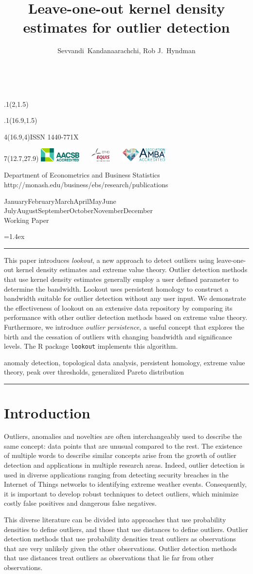 \documentclass[11pt,a4paper,]{article}
\title{Leave-one-out kernel density estimates for outlier detection}
\author{Sevvandi~Kandanaarachchi, Rob J.~Hyndman}
\date{\sf\Date~\Month~\Year}
\makeatletter
\def\Date{\number\day}
\def\Month{\ifcase\month\or
 January\or February\or March\or April\or May\or June\or
 July\or August\or September\or October\or November\or December\fi}
\def\Year{\number\year}
\def\showjel{{\large\textsf{\textbf{JEL classification:}}~\@jel}}
\def\cover{{\sffamily\setcounter{page}{0}
        \thispagestyle{empty}
        \placefig{2}{1.5}{width=5cm}{monash2}
        \placefig{16.9}{1.5}{width=2.1cm}{MBusSchool}
        \begin{textblock}{4}(16.9,4)ISSN 1440-771X\end{textblock}
        \begin{textblock}{7}(12.7,27.9)\hfill
        \includegraphics[height=0.7cm]{AACSB}~~~
        \includegraphics[height=0.7cm]{EQUIS}~~~
        \includegraphics[height=0.7cm]{AMBA}
        \end{textblock}
        \vspace*{2cm}
        \begin{center}\Large
        Department of Econometrics and Business Statistics\\[.5cm]
        \footnotesize http://monash.edu/business/ebs/research/publications
        \end{center}\vspace{2cm}
        \begin{center}
        \fbox{\parbox{14cm}{\begin{onehalfspace}\centering\Huge\vspace*{0.3cm}
                \textsf{\textbf{\expandafter{\@title}}}\vspace{1cm}\par
                \LARGE\@author\end{onehalfspace}
        }}
        \end{center}
        \vfill
                \begin{center}\Large
                \Month~\Year\\[1cm]
                Working Paper \@wp
        \end{center}\vspace*{2cm}}}
\def\pageone{{\sffamily\setstretch{1}%
        \thispagestyle{empty}%
        \vbox to \textheight{%
        \raggedright\baselineskip=1.2cm
     {\fontsize{24.88}{30}\sffamily\textbf{\expandafter{\@title}}}
        \vspace{2cm}\par
        \hspace{1cm}\parbox{14cm}{\sffamily\large\@addresses}\vspace{1cm}\vfill
        \hspace{1cm}{\large\Date~\Month~\Year}\\[1cm]
        \hspace{1cm}\showjel\vss}}}
\def\blindtitle{{\sffamily
     \thispagestyle{plain}\raggedright\baselineskip=1.2cm
     {\fontsize{24.88}{30}\sffamily\textbf{\expandafter{\@title}}}\vspace{1cm}\par
        }}
\def\titlepage{{\cover\newpage\pageone\newpage\blindtitle}}
\let\maketitle\titlepage
\newenvironment{keywords}{\par\vspace{0.5cm}\noindent{\sffamily\textbf{Keywords:}}}{\vspace{0.25cm}\par\hrule\vspace{0.5cm}\par}
\renewenvironment{abstract}{\begin{minipage}{\textwidth}\parskip=1.4ex\noindent
\hrule\vspace{0.1cm}\par{\sffamily\textbf{\abstractname}}\newline}
  {\end{minipage}}
\def\placefig#1#2#3#4{\begin{textblock}{.1}(#1,#2)\rlap{\texttt{[image: \#4]}}\end{textblock}}
\theoremstyle{definition}
\theoremstyle{definition}
\theoremstyle{definition}
\theoremstyle{remark}
\makeatother
\begin{document}
\maketitle
\begin{abstract}
This paper introduces \emph{lookout}, a new approach to detect outliers using leave-one-out kernel density estimates and extreme value theory. Outlier detection methods that use kernel density estimates generally employ a user defined parameter to determine the bandwidth. Lookout uses persistent homology to construct a bandwidth suitable for outlier detection without any user input. We demonstrate the effectiveness of lookout on an extensive data repository by comparing its performance with other outlier detection methods based on extreme value theory. Furthermore, we introduce \emph{outlier persistence}, a useful concept that explores the birth and the cessation of outliers with changing bandwidth and significance levels. The R package \texttt{lookout} implements this algorithm.
\end{abstract}
\begin{keywords}
anomaly detection, topological data analysis, persistent homology, extreme value theory, peak over thresholds, generalized Pareto distribution
\end{keywords}

\hypertarget{introduction}{%
\section{Introduction}\label{introduction}}

Outliers, anomalies and novelties are often interchangeably used to describe the same concept: data points that are unusual compared to the rest. The existence of multiple words to describe similar concepts arise from the growth of outlier detection and applications in multiple research areas. Indeed, outlier detection is used in diverse applications ranging from detecting security breaches in the Internet of Things networks to identifying extreme weather events. Consequently, it is important to develop robust techniques to detect outliers, which minimize costly false positives and dangerous false negatives.

This diverse literature can be divided into approaches that use probability densities to define outliers, and those that use distances to define outliers. Outlier detection methods that use probability densities treat outliers as observations that are very unlikely given the other observations. Outlier detection methods that use distances treat outliers as observations that lie far from other observations.
\end{document}
